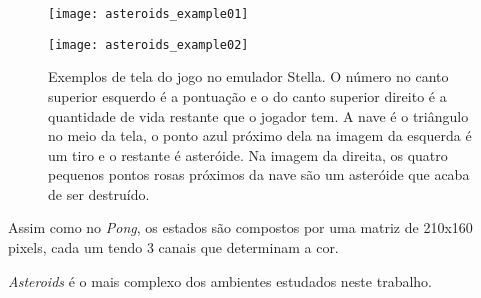 \begin{figure}[h!]
  \begin{minipage}[b]{.5\textwidth}
  \centering
  \texttt{[image: asteroids\_example01]}
  \end{minipage}
  \hfill
  \begin{minipage}[b]{.5\textwidth}
  \texttt{[image: asteroids\_example02]}
  \end{minipage}
  \caption{Exemplos de tela do jogo no emulador Stella. O número no canto superior esquerdo é a pontuação e o do canto superior direito é a quantidade de vida restante que o jogador tem. A nave é o triângulo no meio da tela, o ponto azul próximo dela na imagem da esquerda é um tiro e o restante é asteróide. Na imagem da direita, os quatro pequenos pontos rosas próximos da nave são um asteróide que acaba de ser destruído.}
\end{figure}

Assim como no \textit{Pong}, os estados são compostos por uma matriz de 210x160 pixels, cada um tendo 3 canais que determinam a cor.

\textit{Asteroids} é o mais complexo dos ambientes estudados neste trabalho.




